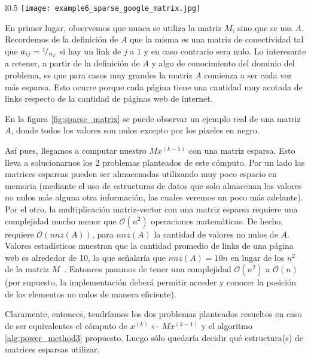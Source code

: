 \begin{wrapfigure}[24]{l}{0.5\textwidth}
    \texttt{[image: example6\_sparse\_google\_matrix.jpg]}
    \caption{Ejemplo de Matriz Esparsa. Los valores no nulos est\'an indicados
    en negro~\cite[p.34]{Langville2006}}
    \label{fig:sparse_matrix}
\end{wrapfigure}

\par En primer lugar, observemos que nunca se utiliza la matriz $M$, sino que se
usa $A$. Recordemos de la definici\'on de $A$ que la misma es una matriz de
conectividad tal que $a_{ij} = {}^{1}\!/_{n_j}$ si hay un link de $j$ a $1$ y en
caso contrario sera nulo. Lo interesante a retener, a partir de la definici\'on
de $A$ y algo de conocimiento del dominio del problema, es que para casos muy
grandes la matriz $A$ comienza a ser cada vez m\'as esparsa. Esto ocurre porque
cada p\'agina tiene una cantidad muy acotada de links respecto de la cantidad de
p\'aginas web de internet.

\par En la figura \ref{fig:sparse_matrix} se puede observar un ejemplo real de
una matriz $A$, donde todos los valores son nulos excepto por los pixeles en
negro.

\par As\'i pues, llegamos a computar nuestro $Mx^{(k-1)}$ con una matriz
esparsa. Esto lleva a solucionarnos los 2 problemas planteados de este
c\'omputo. Por un lado las matrices esparsas pueden ser almacenadas utilizando
muy poco espacio en memoria (mediante el uso de estructuras de datos que solo
almacenan los valores no nulos m\'as alguna otra informaci\'on, las cuales
veremos un poco m\'as adelante). Por el otro, la multiplicaci\'on matriz-vector
con una matriz esparsa requiere una complejidad mucho menor que
$\mathcal{O}(n^2)$ operaciones matem\'aticas. De hecho, requiere
$\mathcal{O}(nnz(A))$, para $nnz(A)$ la cantidad de valores no nulos de $A$.
Valores estad\'isticos muestran que la cantidad promedio de links de una
p\'agina web es alrededor de 10, lo que se\~nalar\'ia que $nnz(A)=10n$ en
lugar de los $n^2$ de la matriz $M$~\cite[p.34]{Langville2006}. Entonces pasamos
de tener una complejidad $\mathcal{O}(n^2)$ a $\mathcal{O}(n)$ (por supuesto,
la implementaci\'on deber\'a permitir acceder y conocer la posici\'on de los
elementos no nulos de manera eficiente).

\par Claramente, entonces, tendr\'iamos los dos problemas planteados resueltos
en caso de ser equivalentes el c\'omputo de $x^{(k)}\gets Mx^{(k-1)}$ y el
algoritmo \ref{alg:power_method3} propuesto. Luego s\'olo quedar\'ia decidir qué
estructura(s) de matrices esparsas utilizar.


